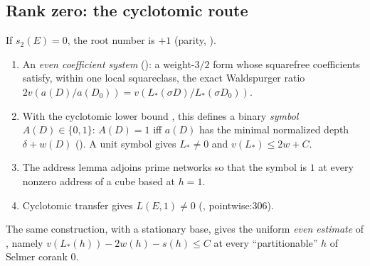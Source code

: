 \documentclass[11pt]{article}
\theoremstyle{remark}
\newcommand{\src}[2]{\textsf{\small #1:#2}}
\begin{document}
\subsection{Rank zero: the cyclotomic route}
If $s_2(E)=0$, the root number is $+1$ (parity, ).
\begin{enumerate}
\item An \emph{even coefficient system} (): a weight-$3/2$
 form whose squarefree coefficients satisfy, within one local squareclass,
 the exact Waldspurger ratio $2v(a(D)/a(D_0))=v(L_*(\sigma D)/L_*(\sigma D_0))$.
\item With the cyclotomic lower bound , this defines a
 binary \emph{symbol} $A(D)\in\{0,1\}$: $A(D)=1$ iff $a(D)$ has the minimal
 normalized depth $\delta+w(D)$ (). A unit symbol gives
 $L_*\ne0$ and $v(L_*)\le2w+C$.
\item The address lemma  adjoins prime networks so that the
 symbol is $1$ at every nonzero address of a cube based at $h=1$.
\item Cyclotomic transfer  gives $L(E,1)\ne0$
 (, \src{pointwise}{306}).
\end{enumerate}
The same construction, with a stationary base, gives the uniform \emph{even
estimate} of , namely $v(L_*(h))-2w(h)-s(h)\le C$ at every
``partitionable'' $h$ of Selmer corank $0$.
\end{document}
